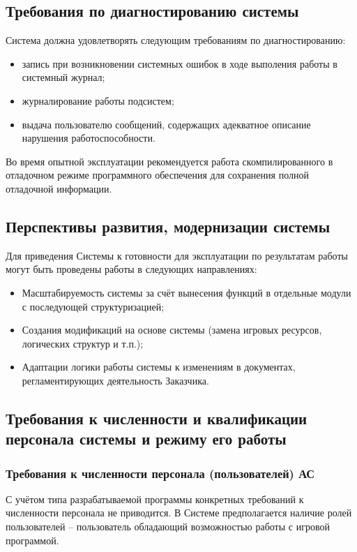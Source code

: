 \subsection{Требования по диагностированию системы}
Система должна удовлетворять следующим требованиям по диагностированию:
\begin{itemize}
    \item запись при возникновении системных ошибок в ходе выполения работы в системный журнал;
    \item журналирование работы подсистем;
    \item выдача пользователю сообщений, содержащих адекватное описание нарушения 
        работоспособности.
\end{itemize}
Во время опытной эксплуатации рекомендуется работа скомпилированного в отладочном режиме 
программного обеспечения для сохранения полной отладочной информации.

\subsection{Перспективы развития, модернизации системы}
Для приведения Системы к готовности для эксплуатации по результатам работы могут быть 
проведены работы в следующих направлениях:
\begin{itemize}
    \item Масштабируемость системы за счёт вынесения функций в отдельные модули с 
        последующей структуризацией;
    \item Создания модификаций на основе системы (замена игровых ресурсов, логических 
        структур и т.п.);
    \item Адаптации логики работы системы к изменениям в документах, регламентирующих 
        деятельность Заказчика.
\end{itemize}

\subsection{Требования к численности и квалификации персонала системы и режиму его работы}
\subsubsection{Требования к численности персонала (пользователей) АС}
С учётом типа разрабатываемой программы конкретных требований к численности персонала не 
приводится. В Системе предполагается наличие ролей пользователей -- пользователь 
обладающий возможностью работы с игровой программой.

